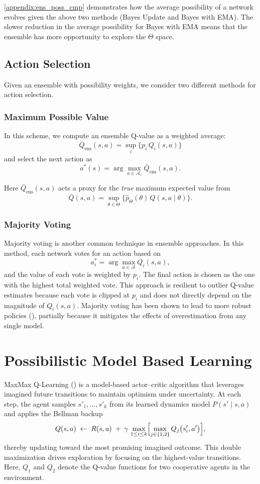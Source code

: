 \documentclass[11pt,a4paper]{report}
\begin{document}
\ref{appendix:ens_poss_cmp} demonstrates how the average possibility of a network evolves given the above two methods (Bayes Update and Bayes with EMA). The slower reduction in the average possibility for Bayes with EMA means that the ensemble has more opportunity to explore the $\Theta$ space.  

\section{Action Selection}
Given an ensemble with possibility weights, we consider two different methods for action selection.

\subsection{Maximum Possible Value}
In this scheme, we compute an ensemble Q-value as a weighted average:
\[
  \bar{Q}_{\text{ens}}(s,a) = \sup_{i} \{p_i\, Q_i(s,a)\}
\]
and select the next action as
\[ a^*(s) = \arg \max_{a \in \mathcal{A}_s} \bar{Q}_{\text{ens}}(s,a). \]

Here $\bar{Q}_{\text{ens}}(s,a)$ acts a proxy for the \emph{true} maximum expected value from 
\[ \bar{Q}(s,a) =\sup_{\theta\in\Theta}\bigl\{\hat{p}_\Theta(\theta)\,Q(s,a\mid\theta)\bigr\}. \]

\subsection{Majority Voting}
Majority voting is another common technique in ensemble approaches. In this method, each network votes for an action based on
\[
  a_i^* = \arg \max_{a \in \mathcal{A}} Q_i(s,a),
\]
and the value of each vote is weighted by \(p_i\). The final action is chosen as the one with the highest total weighted vote. This approach is resilient to outlier Q-value estimates because each vote is clipped at \(p_i\) and does not directly depend on the magnitude of \(Q_i(s,a)\). Majority voting has been shown to lead to more robust policies (\cite{Hans2010}), partially because it mitigates the effects of overestimation from any single model.

\chapter{Possibilistic Model Based Learning}
\label{chapter:pqml}

MaxMax Q-Learning (\cite{zhu2024maxmax}) is a model-based actor–critic algorithm that leverages imagined future transitions to maintain optimism under uncertainty. At each step, the agent samples \(s'_1,\dots,s'_k\) from its learned dynamics model \(P(s'\mid s,a)\) and applies the Bellman backup
\[
  Q(s,a)\;\leftarrow\;R(s,a)\;+\;\gamma\,\max_{1\le i\le k}\Bigl[\max_{j\in\{1,2\}}Q_j\bigl(s'_i,a'\bigr)\Bigr],
\]
thereby updating toward the most promising imagined outcome. This double maximization drives exploration by focusing on the highest-value transitions. Here, \(Q_1\) and \(Q_2\) denote the Q-value functions for two cooperative agents in the environment.
\end{document}
